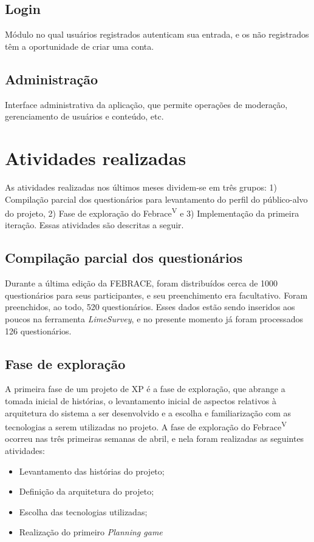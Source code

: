   \subsection{Login}
    Módulo no qual usuários registrados autenticam sua entrada, e os não registrados têm a oportunidade de criar uma conta.

  \subsection{Administração}
    Interface administrativa da aplicação, que permite operações de moderação, gerenciamento de usuários e conteúdo, etc.

\section{Atividades realizadas}
  As atividades realizadas nos últimos meses dividem-se em três grupos: 1) Compilação parcial dos questionários para levantamento do perfil do público-alvo do projeto, 2) Fase de exploração do Febrace\textsuperscript{V} e 3) Implementação da primeira iteração. Essas atividades são descritas a seguir.

  \subsection{Compilação parcial dos questionários}
    Durante a última edição da FEBRACE, foram distribuídos cerca de 1000 questionários para seus participantes, e seu preenchimento era facultativo. Foram preenchidos, ao todo, 520 questionários. Esses dados estão sendo inseridos aos poucos na ferramenta \textit{LimeSurvey}, e no presente momento já foram processados 126 questionários.

  \subsection{Fase de exploração}
    A primeira fase de um projeto de XP é a fase de exploração\cite{beck04}, que abrange a tomada inicial de histórias, o levantamento inicial de aspectos relativos à arquitetura do sistema a ser desenvolvido e a escolha e familiarização com as tecnologias a serem utilizadas no projeto.
    A fase de exploração do Febrace\textsuperscript{V} ocorreu nas três primeiras semanas de abril, e nela foram realizadas as seguintes atividades:

    \begin{itemize}
      \item
        Levantamento das histórias do projeto;
      \item
        Definição da arquitetura do projeto;
      \item
        Escolha das tecnologias utilizadas;
      \item
        Realização do primeiro \textit{Planning game}
    \end{itemize}


